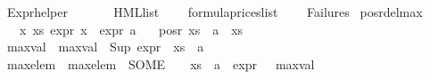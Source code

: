 %
\begin{isabellebody}%
%
%
\isadelimtheory
%
\endisadelimtheory
%
\isatagtheory
{}\isamarkupfalse%
\ Expr{\isacharunderscore}{\kern0pt}helper\isanewline
\ \ \isanewline
\ \ \ \ HML{\isacharunderscore}{\kern0pt}list\isanewline
\ \ \ \ formula{\isacharunderscore}{\kern0pt}prices{\isacharunderscore}{\kern0pt}list\isanewline
\ \ \ \ Failures\isanewline
{}%
\endisatagtheory
{\isafoldtheory}%
%
\isadelimtheory
\isanewline
%
\endisadelimtheory
\isanewline
{}\isamarkupfalse%
\ pos{\isacharunderscore}{\kern0pt}r{\isacharunderscore}{\kern0pt}del{\isacharunderscore}{\kern0pt}max{\isacharcolon}{\kern0pt}\isanewline
\ \ \ {\isachardoublequoteopen}{\isasymforall}x{\isasymin}\ xs{\isachardot}{\kern0pt}\ expr{\isacharunderscore}{\kern0pt}{}\ x\ {\isacharless}{\kern0pt}\ expr{\isacharunderscore}{\kern0pt}{}\ a{\isachardoublequoteclose}\isanewline
\ \ \ {\isachardoublequoteopen}pos{\isacharunderscore}{\kern0pt}r\ {\isacharparenleft}{\kern0pt}xs\ {\isasymunion}\ {\isacharbraceleft}{\kern0pt}a{\isacharbraceright}{\kern0pt}{\isacharparenright}{\kern0pt}\ {\isacharequal}{\kern0pt}\ xs{\isachardoublequoteclose}\isanewline
%
\isadelimproof
%
\endisadelimproof
%
\isatagproof
{}\isamarkupfalse%
{\isacharminus}{\kern0pt}\isanewline
\ \ \isamarkupfalse%
\ max{\isacharunderscore}{\kern0pt}val\ \ {\isachardoublequoteopen}max{\isacharunderscore}{\kern0pt}val\ {\isasymequiv}\ {\isacharparenleft}{\kern0pt}Sup\ {\isacharparenleft}{\kern0pt}expr{\isacharunderscore}{\kern0pt}{}\ {\isacharbackquote}{\kern0pt}\ {\isacharparenleft}{\kern0pt}xs\ {\isasymunion}\ {\isacharbraceleft}{\kern0pt}a{\isacharbraceright}{\kern0pt}{\isacharparenright}{\kern0pt}{\isacharparenright}{\kern0pt}{\isacharparenright}{\kern0pt}{\isachardoublequoteclose}\isanewline
\ \ \isamarkupfalse%
\ max{\isacharunderscore}{\kern0pt}elem\ \ {\isachardoublequoteopen}max{\isacharunderscore}{\kern0pt}elem\ {\isasymequiv}\ {\isacharparenleft}{\kern0pt}SOME\ {\isasympsi}{\isachardot}{\kern0pt}\ {\isasympsi}\ {\isasymin}\ {\isacharparenleft}{\kern0pt}xs\ {\isasymunion}\ {\isacharbraceleft}{\kern0pt}a{\isacharbraceright}{\kern0pt}{\isacharparenright}{\kern0pt}\ {\isasymand}\ expr{\isacharunderscore}{\kern0pt}{}\ {\isasympsi}\ {\isacharequal}{\kern0pt}\ max{\isacharunderscore}{\kern0pt}val{\isacharparenright}{\kern0pt}{\isachardoublequoteclose}\isanewline

\end{isabellebody}

